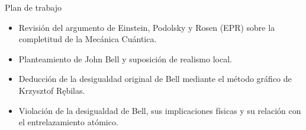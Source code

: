 \begin{frame}{Plan de trabajo}{}
\begin{itemize}
	\item Revisión del argumento de Einstein, Podolsky y Rosen (EPR) sobre la completitud de la Mecánica Cuántica.\vspace{3mm}
	\item Planteamiento de John Bell y suposición de realismo local.\vspace{3mm}
	\item Deducción de la desigualdad original de Bell mediante el método gráfico de Krzysztof R\k{e}bilas.\vspace{3mm}
	\item Violación de la desigualdad de Bell, sus implicaciones físicas y su relación con el entrelazamiento atómico.
\end{itemize}
\end{frame}
